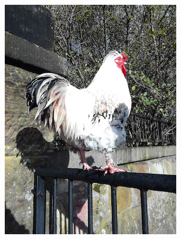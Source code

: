 \documentclass{l4proj}
\begin{document}
\begin{figure}[ht]
\begin{subfigure}[h!]{0.18\textwidth}
    \includegraphics[width=\textwidth, trim={0cm 1.6cm 0cm 1.6cm}, clip]{images/dataset/chicken/rgb.png}

\end{subfigure}
\end{figure}
\end{document}
